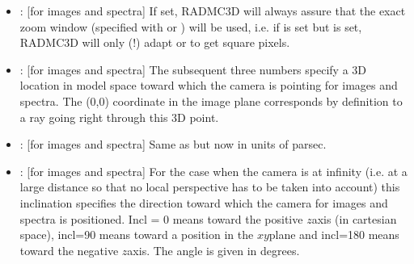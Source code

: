 \documentclass[letterpaper,10pt,english]{sphinxmanual}
\begin{document}
\begin{itemize}
\item {} 
: {[}for images and spectra{]} If set, RADMC\sphinxhyphen{}3D will always assure
that the exact zoom window (specified with  or )
will be used, i.e. if  is  set but 
is set, RADMC\sphinxhyphen{}3D will only (!) adapt  or  to get
 square pixels.

\item {} 
: {[}for images and spectra{]} The subsequent three
numbers specify a 3\sphinxhyphen{}D location in model space toward which the camera is
pointing for images and spectra.  The (0,0) coordinate in the image plane
corresponds by definition to a ray going right through this 3\sphinxhyphen{}D point.

\item {} 
: {[}for images and spectra{]} Same as  but
now in units of parsec.

\item {} 
: {[}for images and spectra{]} For the case when the camera
is at infinity (i.e. at a large distance so that no local perspective has
to be taken into account) this inclination specifies the direction toward
which the camera for images and spectra is positioned. Incl = 0 means
toward the positive \(z\)\sphinxhyphen{}axis (in cartesian space), incl=90 means toward a
position in the \(x\)\sphinxhyphen{}\(y\)\sphinxhyphen{}plane and incl=180 means toward the negative
\(z\)\sphinxhyphen{}axis. The angle is given in degrees.


\end{itemize}
\end{document}
